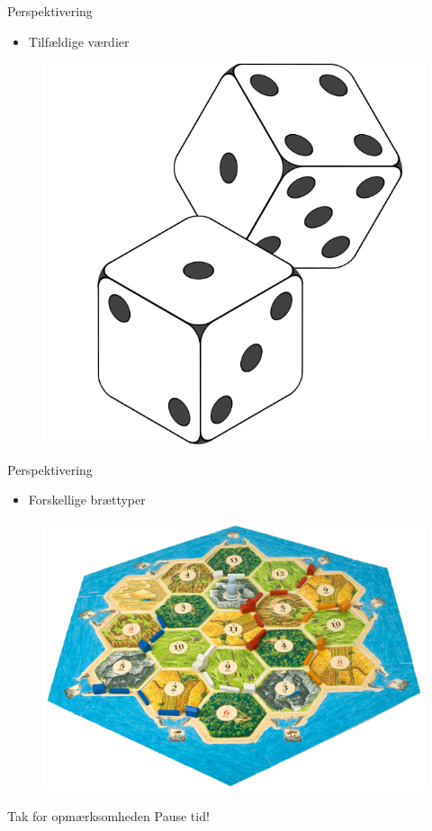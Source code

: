 \begin{frame}{Perspektivering}
  \vspace{0.4cm}
  \begin{itemize}
		\item Tilfældige værdier
	\end{itemize}
	\begin{figure}[H]
   			\includegraphics[scale=0.15]{billeder/2-Dice-Icon.png}
	\end{figure}	
\end{frame}

\begin{frame}{Perspektivering}
	\vspace{0.4cm}
	\begin{itemize}
		\item Forskellige brættyper
	\end{itemize}
	\begin{figure}[H]
   		\includegraphics[scale=0.3]{billeder/settlers-board2.png}
	\end{figure}	
\end{frame}

\begin{frame}{Tak for opmærksomheden}
\centering
\Huge{Pause tid!}

\end{frame}